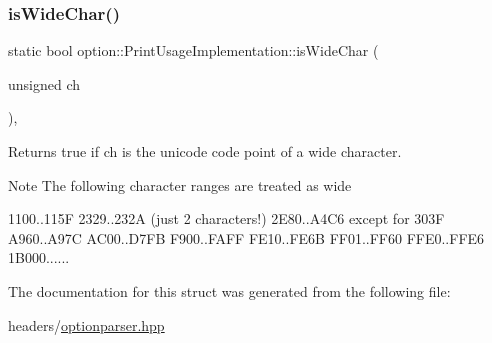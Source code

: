 \subsubsection{\texorpdfstring{is\+Wide\+Char()}{isWideChar()}}
{\footnotesize\ttfamily static bool option\+::\+Print\+Usage\+Implementation\+::is\+Wide\+Char (\begin{DoxyParamCaption}\item[{unsigned}]{ch }\end{DoxyParamCaption})\hspace{0.3cm}{\ttfamily [inline]}, {\ttfamily [static]}}



Returns true if ch is the unicode code point of a wide character. 

\begin{DoxyNote}{Note}
The following character ranges are treated as wide 
\begin{DoxyCode}
1100..115F
2329..232A  (just 2 characters!)
2E80..A4C6  except \textcolor{keywordflow}{for} 303F
A960..A97C
AC00..D7FB
F900..FAFF
FE10..FE6B
FF01..FF60
FFE0..FFE6
1B000......
\end{DoxyCode}
 
\end{DoxyNote}


The documentation for this struct was generated from the following file\+:\begin{DoxyCompactItemize}
\item 
headers/\hyperlink{optionparser_8hpp}{optionparser.\+hpp}\end{DoxyCompactItemize}
